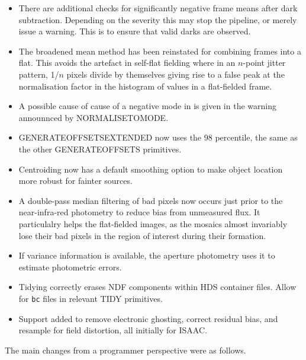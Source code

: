 \documentclass[twoside,11pt]{article}
\newcommand{\htmladdnormallink}[2]{#1}
\renewcommand{\_}{\texttt{\symbol{95}}}
\newcommand{\ISAAC}{\htmladdnormallink{ISAAC}{http://www.eso.org/instruments/isaac/}}
\begin{document}
\begin{itemize}
   \item There are additional checks for significantly negative frame
   means after dark subtraction.  Depending on the severity this may
   stop the pipeline, or merely issue a warning.  This is to ensure
   that valid darks are observed.

   \item The broadened mean method has been reinstated for combining
   frames into a flat.  This avoids the artefact in self-flat fielding
   where in an $n$-point jitter pattern, 1/$n$ pixels divide by
   themselves giving rise to a false peak at the normalisation factor
   in the histogram of values in a flat-fielded frame.

   \item A possible cause of cause of a negative mode in is given in
   the warning announnced by \_NORMALISE\_TO\_MODE\_.
   
   \item \_GENERATE\_OFFSETS\_EXTENDED\_ now uses the 98 percentile,
   the same as the other \_GENERATE\_OFFSETS\_ primitives.
   
   \item Centroiding now has a default smoothing option to make
   object location more robust for fainter sources.

   \item A double-pass median filtering of bad pixels now occurs just prior
   to the near-infra-red photometry to reduce bias from unmeasured flux.
   It particulalry helps the flat-fielded images, as the mosaics 
   almost invariably lose their bad pixels in the region of interest
   during their formation.
  
   \item If variance information is available, the aperture photometry
   uses it to estimate photometric errors.

   \item Tidying correctly erases NDF components within HDS container
   files.  Allow for {\tt \_bc} files in relevant \_TIDY\_ primitives.

   \item Support added to remove electronic ghosting, correct residual
   bias, and resample for field distortion, all initially for \ISAAC.
\end{itemize}

The main changes from a programmer perspective were as follows.
\end{document}
